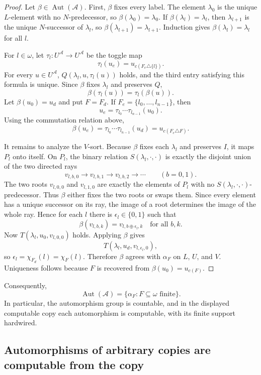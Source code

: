 \documentclass[12pt]{article}
\theoremstyle{definition}
\theoremstyle{remark}
\newcommand{\Aut}{\operatorname{Aut}}
\begin{document}
\begin{proof}
Let \(\beta\in\Aut(\mathcal A)\).  First, \(\beta\) fixes every label.  The element \(\lambda_0\) is the unique \(L\)-element with no \(N\)-predecessor, so \(\beta(\lambda_0)=\lambda_0\).  If \(\beta(\lambda_l)=\lambda_l\), then \(\lambda_{l+1}\) is the unique \(N\)-successor of \(\lambda_l\), so \(\beta(\lambda_{l+1})=\lambda_{l+1}\).  Induction gives \(\beta(\lambda_l)=\lambda_l\) for all \(l\).

For \(l\in\omega\), let \(\tau_l:U^{\mathcal A}\to U^{\mathcal A}\) be the toggle map
\[
\tau_l(u_e)=u_{c(F_e\triangle\{l\})}.
\]
For every \(u\in U^{\mathcal A}\), \(Q(\lambda_l,u,\tau_l(u))\) holds, and the third entry satisfying this formula is unique.  Since \(\beta\) fixes \(\lambda_l\) and preserves \(Q\),
\[
\beta(\tau_l(u))=\tau_l(\beta(u)).
\]
Let \(\beta(u_0)=u_d\) and put \(F=F_d\).  If \(F_e=\{l_0,\dots,l_{n-1}\}\), then
\[
u_e=\tau_{l_0}\cdots\tau_{l_{n-1}}(u_0).
\]
Using the commutation relation above,
\[
\beta(u_e)
=\tau_{l_0}\cdots\tau_{l_{n-1}}(u_d)
=u_{c(F_e\triangle F)}.
\]

It remains to analyze the \(V\)-sort.  Because \(\beta\) fixes each \(\lambda_l\) and preserves \(I\), it maps \(P_l\) onto itself.  On \(P_l\), the binary relation \(S(\lambda_l,\cdot,\cdot)\) is exactly the disjoint union of the two directed rays
\[
v_{l,b,0}\to v_{l,b,1}\to v_{l,b,2}\to\cdots
\qquad (b=0,1).
\]
The two roots \(v_{l,0,0}\) and \(v_{l,1,0}\) are exactly the elements of \(P_l\) with no \(S(\lambda_l,\cdot,\cdot)\)-predecessor.  Thus \(\beta\) either fixes the two roots or swaps them.  Since every element has a unique successor on its ray, the image of a root determines the image of the whole ray.  Hence for each \(l\) there is \(\epsilon_l\in\{0,1\}\) such that
\[
\beta(v_{l,b,k})=v_{l,b\oplus\epsilon_l,k}
\quad\text{for all }b,k.
\]
Now \(T(\lambda_l,u_0,v_{l,0,0})\) holds.  Applying \(\beta\) gives
\[
T(\lambda_l,u_d,v_{l,\epsilon_l,0}),
\]
so \(\epsilon_l=\chi_{F_d}(l)=\chi_F(l)\).  Therefore \(\beta\) agrees with \(\alpha_F\) on \(L\), \(U\), and \(V\).  Uniqueness follows because \(F\) is recovered from \(\beta(u_0)=u_{c(F)}\).
\end{proof}

Consequently,
\[
\Aut(\mathcal A)=\{\alpha_F:F\subseteq\omega\text{ finite}\}.
\]
In particular, the automorphism group is countable, and in the displayed computable copy each automorphism is computable, with its finite support hardwired.

\subsection{Automorphisms of arbitrary copies are computable from the copy}\label{sec:copies}
\end{document}
